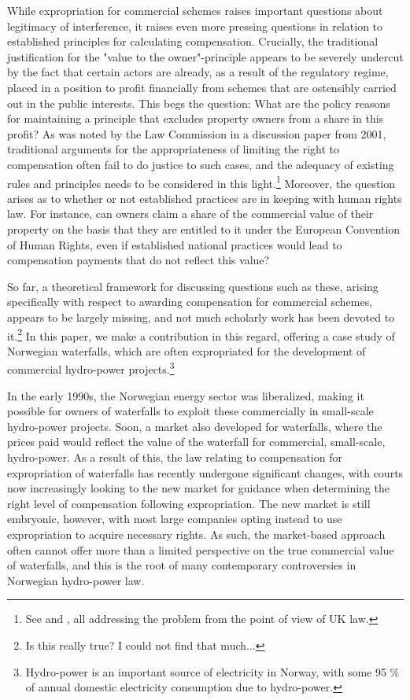 While expropriation for commercial schemes raises important questions about legitimacy of interference, it raises even more pressing questions in relation to established principles for calculating compensation. Crucially, the traditional justification for the "value to the owner"-principle appears to be severely undercut by the fact that certain actors are already, as a result of the regulatory regime, placed in a position to profit financially from schemes that are ostensibly carried out in the public interests. This begs the question: What are the policy reasons for maintaining a principle that excludes property owners from a share in this profit? As was noted by the Law Commission in a discussion paper from 2001, traditional arguments for the appropriateness of limiting the right to compensation often fail to do justice to such cases, and the adequacy of existing rules and principles needs to be considered in this light.\footnote{See \cite{lcdisc} and \cite{newuk,kelouk}, all addressing the problem from the point of view of UK law.} Moreover, the question arises as to whether or not established practices are in keeping with human rights law. For instance, can owners claim a share of the commercial value of their property on the basis that they are entitled to it under the European Convention of Human Rights, even if established national practices would lead to compensation payments that do not reflect this value?

So far, a theoretical framework for discussing questions such as these, arising specifically with respect to awarding compensation for commercial schemes, appears to be largely missing, and not much scholarly work has been devoted to it.\footnote{Is this really true? I could not find that much...} In this paper, we make a contribution in this regard, offering a case study of Norwegian waterfalls, which are often expropriated for the development of commercial hydro-power projects.\footnote{Hydro-power is an important source of electricity in Norway, with some 95 \% of annual domestic electricity consumption due to hydro-power.} 

In the early 1990s, the Norwegian energy sector was liberalized, making it possible for owners of waterfalls to exploit these commercially in small-scale hydro-power projects. Soon, a market also developed for waterfalls, where the prices paid would reflect the value of the waterfall for commercial, small-scale, hydro-power. As a result of this, the law relating to compensation for expropriation of waterfalls has recently undergone significant changes, with courts now increasingly looking to the new market for guidance when determining the right level of compensation following expropriation. The new market is still embryonic, however, with most large companies opting instead to use expropriation to acquire necessary rights. As such, the market-based approach often cannot offer more than a limited perspective on the true commercial value of waterfalls, and this is the root of many contemporary controversies in Norwegian hydro-power law.

